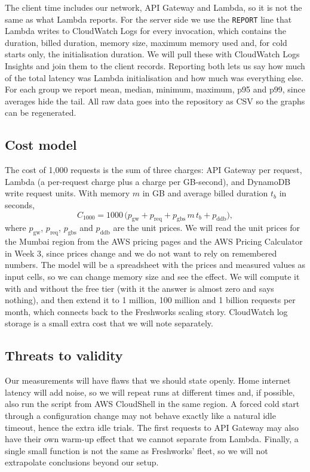 \documentclass[10pt,a4paper]{article}
\newcommand{\code}[1]{\texttt{#1}}
\begin{document}
The client time includes our network, API Gateway and Lambda, so it is not the same as what Lambda reports. For the server side we use the \code{REPORT} line that Lambda writes to CloudWatch Logs for every invocation, which contains the duration, billed duration, memory size, maximum memory used and, for cold starts only, the initialisation duration. We will pull these with CloudWatch Logs Insights and join them to the client records. Reporting both lets us say how much of the total latency was Lambda initialisation and how much was everything else. For each group we report mean, median, minimum, maximum, p95 and p99, since averages hide the tail. All raw data goes into the repository as CSV so the graphs can be regenerated.

\subsection{Cost model}

The cost of 1{,}000 requests is the sum of three charges: API Gateway per request, Lambda (a per-request charge plus a charge per GB-second), and DynamoDB write request units. With memory $m$ in GB and average billed duration $t_b$ in seconds,
\[
C_{1000} = 1000\,\bigl(p_{\text{gw}} + p_{\text{req}} + p_{\text{gbs}}\, m\, t_b + p_{\text{ddb}}\bigr),
\]
where $p_{\text{gw}}$, $p_{\text{req}}$, $p_{\text{gbs}}$ and $p_{\text{ddb}}$ are the unit prices. We will read the unit prices for the Mumbai region from the AWS pricing pages and the AWS Pricing Calculator in Week 3, since prices change and we do not want to rely on remembered numbers. The model will be a spreadsheet with the prices and measured values as input cells, so we can change memory size and see the effect. We will compute it with and without the free tier (with it the answer is almost zero and says nothing), and then extend it to 1 million, 100 million and 1 billion requests per month, which connects back to the Freshworks scaling story. CloudWatch log storage is a small extra cost that we will note separately.

\subsection{Threats to validity}

Our measurements will have flaws that we should state openly. Home internet latency will add noise, so we will repeat runs at different times and, if possible, also run the script from AWS CloudShell in the same region. A forced cold start through a configuration change may not behave exactly like a natural idle timeout, hence the extra idle trials. The first requests to API Gateway may also have their own warm-up effect that we cannot separate from Lambda. Finally, a single small function is not the same as Freshworks' fleet, so we will not extrapolate conclusions beyond our setup.
\end{document}
